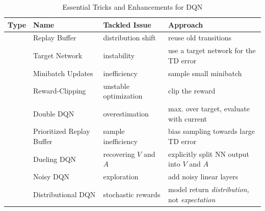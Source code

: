 	\begin{table}
		\centering
		\begin{tabular}{c|lll}
			\toprule
			                   \textbf{Type}                     & \textbf{Name}             & \textbf{Tackled Issue}     & \textbf{Approach}                                        \\ \midrule
			\multirowcell{4}{\rotatebox{90}{\textbf{Essential}}} & Replay Buffer             & distribution shift         & reuse old transitions                                    \\
			                                                     & Target Network            & instability                & use a target network for the \acs{TD} error              \\
			                                                     & Minibatch Updates         & inefficiency               & sample small minibatch                                   \\
			                                                     & Reward-Clipping           & unstable optimization      & clip the reward                                          \\ \midrule
			\multirowcell{5}{\rotatebox{90}{\textbf{Enhance.}}}  & Double \acs{DQN}          & overestimation             & max. over target, evaluate with current                  \\
			                                                     & Prioritized Replay Buffer & sample inefficiency        & bias sampling towards large \acs{TD} error               \\
			                                                     & Dueling \acs{DQN}         & recovering \(V\) and \(A\) & explicitly split \acs{NN} output into \(V\) and \(A\)    \\
			                                                     & Noisy \acs{DQN}           & exploration                & add noisy linear layers                                  \\
			                                                     & Distributional \acs{DQN}  & stochastic rewards         & model return \emph{distribution,} not \emph{expectation} \\ \bottomrule
		\end{tabular}
		\caption{Essential Tricks and Enhancements for \acs{DQN}}
		\label{tab:dqnHacks}
	\end{table}

